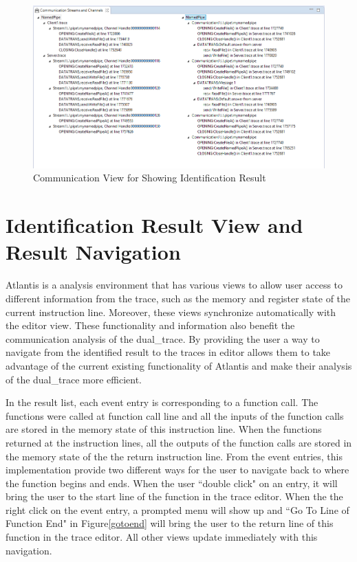 \begin{figure}[H]
\centerline{\includegraphics[scale=0.7]{Figures/idenview}}
 \caption{Communication View for Showing Identification Result}
\label{idenview}
\end{figure}

\section{Identification Result View and Result Navigation}
Atlantis is a analysis environment that has various views to allow user access to different information from the trace, such as the memory and register state of the current instruction line. Moreover, these views synchronize automatically with the editor view. These functionality and information also benefit the communication analysis of the dual\_trace. By providing the user a way to navigate from the identified result to the traces in editor allows them to take advantage of the current existing functionality of Atlantis and make their analysis of the dual\_trace more efficient.

In the result list, each event entry is corresponding to a function call. The functions were called at function call line and all the inputs of the function calls are stored in the memory state of this instruction line. When the functions returned at the instruction lines, all the outputs of the function calls are stored in the memory state of the the return instruction line. From the event entries, this implementation provide two different ways for the user to navigate back to where the function begins and ends. When the user ``double click" on an entry, it will bring the user to the start line of the function in the trace editor. When the the right click on the event entry, a prompted menu will show up and ``Go To Line of Function End" in Figure\ref{gotoend} will bring the user to the return line of this function in the trace editor. All other views update immediately with this navigation. 

